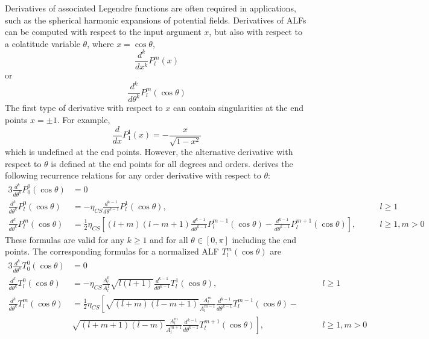 \documentclass[12pt]{article}
\begin{document}
Derivatives of associated Legendre functions are often required in
applications, such as the spherical harmonic expansions of potential fields.
Derivatives of ALFs can be computed with respect to the input argument
$x$, but also with respect to a colatitude variable $\theta$, where
$x = \cos{\theta}$,
\begin{equation}
\frac{d^k}{dx^k} P_l^m(x)
\end{equation}
or
\begin{equation}
\frac{d^k}{d\theta^k} P_l^m(\cos{\theta})
\end{equation}
The first type of derivative with respect to $x$ can contain singularities
at the end points $x = \pm 1$. For example,
\begin{equation}
\frac{d}{dx} P_1^1(x) = -\frac{x}{\sqrt{1-x^2}}
\end{equation}
which is undefined at the end points. However, the alternative derivative with
respect to $\theta$ is defined at the end points for all degrees and orders.
\citet{bosch2000} derives the following recurrence relations for any order
derivative with respect to $\theta$:
\begin{alignat}{3}
\frac{d^k}{d\theta^k} P_0^0(\cos{\theta}) &= 0 & \\
\frac{d^k}{d\theta^k} P_l^0(\cos{\theta}) &= -\eta_{CS} \frac{d^{k-1}}{d\theta^{k-1}} P_l^1(\cos{\theta}), & \qquad l \geq 1 \\
\frac{d^k}{d\theta^k} P_l^m(\cos{\theta}) &= \frac{1}{2} \eta_{CS} \left[ (l+m)(l-m+1) \frac{d^{k-1}}{d\theta^{k-1}} P_l^{m-1}(\cos{\theta}) - \frac{d^{k-1}}{d\theta^{k-1}} P_l^{m+1}(\cos{\theta}) \right], & \qquad l \geq 1, m > 0
\end{alignat}
These formulas are valid for any $k \geq 1$ and for all $\theta \in [0,\pi]$ including the end points.
The corresponding formulas for a normalized ALF $T_l^m(\cos{\theta})$ are
\begin{alignat}{3}
\frac{d^k}{d\theta^k} T_0^0(\cos{\theta}) &= 0 \\
\frac{d^k}{d\theta^k} T_l^0(\cos{\theta}) &= -\eta_{CS} \frac{A_l^0}{A_l^1} \sqrt{l(l+1)} \frac{d^{k-1}}{d\theta^{k-1}} T_l^1(\cos{\theta}), & \qquad l \geq 1 \label{eqn:DR2} \\
\frac{d^k}{d\theta^k} T_l^m(\cos{\theta}) &= \frac{1}{2} \eta_{CS}
\left[
\sqrt{(l+m)(l-m+1)} \frac{A_l^m}{A_l^{m-1}} \frac{d^{k-1}}{d\theta^{k-1}} T_l^{m-1}(\cos{\theta}) - \right. \nonumber \\
&
\left.
\sqrt{(l+m+1)(l-m)} \frac{A_l^m}{A_l^{m+1}} \frac{d^{k-1}}{d\theta^{k-1}} T_l^{m+1}(\cos{\theta})
\right], & \qquad l \geq 1, m > 0 \label{eqn:DR3}
\end{alignat}
\end{document}
